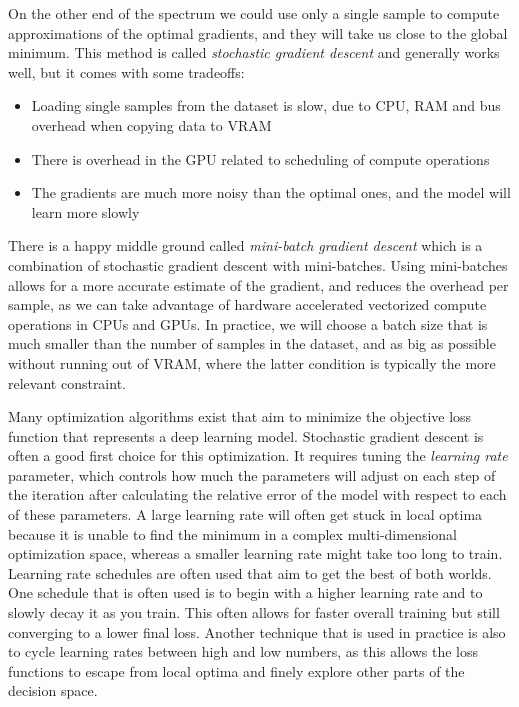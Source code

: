 On the other end of the spectrum we could use only a single sample to compute approximations of the optimal gradients, and they will take us close to the global minimum.
This method is called \textit{stochastic gradient descent} and generally works well, but it comes with some tradeoffs:
\begin{itemize}
    \item Loading single samples from the dataset is slow, due to CPU, RAM and bus overhead when copying data to VRAM
    \item There is overhead in the GPU related to scheduling of compute operations
    \item The gradients are much more noisy than the optimal ones, and the model will learn more slowly
\end{itemize}
There is a happy middle ground called \textit{mini-batch gradient descent} which is a combination of stochastic gradient descent with mini-batches.
Using mini-batches allows for a more accurate estimate of the gradient, and reduces the overhead per sample, as we can take advantage of hardware accelerated vectorized compute operations in CPUs and GPUs.
In practice, we will choose a batch size that is much smaller than the number of samples in the dataset, and as big as possible without running out of VRAM, where the latter condition is typically the more relevant constraint.

Many optimization algorithms exist that aim to minimize the objective loss function that represents a deep learning model. Stochastic
gradient descent is often a good first choice for this optimization. It requires tuning the \textit{learning rate} parameter, which controls how much the parameters
will adjust on each step of the iteration after calculating the relative error of the model with respect to each of these parameters. A large learning rate
will often get stuck in local optima because it is unable to find the minimum in a complex multi-dimensional optimization space, whereas a smaller learning rate
might take too long to train. Learning rate schedules are often used that aim to get the best of both worlds. One schedule that is often used is to
begin with a higher learning rate and to slowly decay it as you train. This often allows for faster overall training but still converging to a lower final loss.
Another technique that is used in practice is also to cycle learning rates between high and low numbers, as this allows the loss functions to escape
from local optima and finely explore other parts of the decision space.

